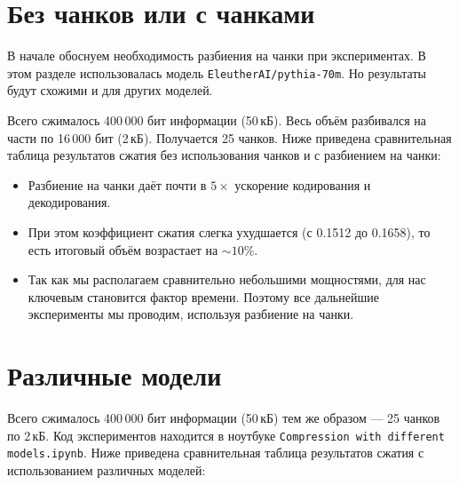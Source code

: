 \documentclass[a4paper,11pt]{article}
\begin{document}
\section*{Без чанков или с чанками}

В начале обоснуем необходимость разбиения на чанки при экспериментах. В этом разделе использовалась модель \texttt{EleutherAI/pythia-70m}. Но результаты будут схожими и для других моделей.

Всего сжималось 400\,000 бит информации (50\,кБ). Весь объём разбивался на части по 16\,000 бит (2\,кБ). Получается 25 чанков.
Ниже приведена сравнительная таблица результатов сжатия без использования чанков и с разбиением на чанки:

\begin{table}[ht]
\centering
{}
\caption{Сравнение без чанков и с чанками}
\end{table}

\begin{itemize}
  \item Разбиение на чанки даёт почти в $5\times$ ускорение кодирования и декодирования.
  \item При этом коэффициент сжатия слегка ухудшается (с 0.1512 до 0.1658), то есть итоговый объём возрастает на $\sim10\%$.
  \item Так как мы располагаем сравнительно небольшими мощностями, для нас ключевым становится фактор времени. Поэтому все дальнейшие эксперименты мы проводим, используя разбиение на чанки.
\end{itemize}

\section*{Различные модели}

Всего сжималось 400\,000 бит информации (50\,кБ) тем же образом — 25 чанков по 2\,кБ.
Код экспериментов находится в ноутбуке \texttt{Compression with different models.ipynb}.
Ниже приведена сравнительная таблица результатов сжатия с использованием различных моделей:
\end{document}
